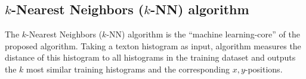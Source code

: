 \documentclass{report}
\begin{document}
\subsection{$k$-Nearest Neighbors ($k$-NN) algorithm}
\label{sec:knn}

The $k$-Nearest Neighbors ($k$-NN) algorithm is the ``machine
learning-core'' of the proposed algorithm. Taking a texton histogram
as input, algorithm measures the distance of this histogram to all
histograms in the training dataset and outputs the $k$ most similar
training histograms and the corresponding $x,y$-positions.

\end{document}
